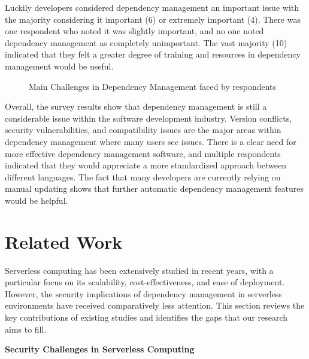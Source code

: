 \documentclass[sigconf]{acmart}
\begin{document}
Luckily developers considered dependency management an important issue with the majority considering it important (6) or extremely important (4). There was one respondent who noted it was slightly important, and no one noted dependency management as completely unimportant. The vast majority (10) indicated that they felt a greater degree of training and resources in dependency management would be useful.

\begin{figure}[ht]
	\centering
	\caption{Main Challenges in Dependency Management faced by respondents}
	\label{fig:challenges}
\end{figure}

Overall, the survey results show that dependency management is still a considerable issue within the software development industry. Version conflicts, security vulnerabilities, and compatibility issues are the major areas within dependency management where many users see issues. There is a clear need for more effective dependency management software, and multiple respondents indicated that they would appreciate a more standardized approach between different languages. The fact that many developers are currently relying on manual updating shows that further automatic dependency management features would be helpful.

\section{Related Work}
Serverless computing has been extensively studied in recent years, with a particular focus on its scalability, cost-effectiveness, and ease of deployment. However, the security implications of dependency management in serverless environments have received comparatively less attention. This section reviews the key contributions of existing studies and identifies the gaps that our research aims to fill.

\textbf{Security Challenges in Serverless Computing}
\end{document}
